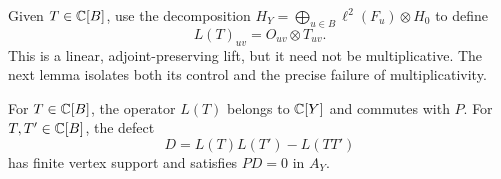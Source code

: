 Given $T\in\mathbb C[B]$, use the decomposition
$H_Y=\bigoplus_{u\in B}\ell^2(F_u)\otimes H_0$ to define
\begin{equation}\label{eq:transport-lift}
 L(T)_{uv}=O_{uv}\otimes T_{uv}.
\end{equation}
This is a linear, adjoint-preserving lift, but it need not be
multiplicative.  The next lemma isolates both its control and the precise
failure of multiplicativity.

\begin{lemma}\label{ana:transport-defect}
For $T\in\mathbb C[B]$, the operator $L(T)$ belongs to $\mathbb C[Y]$ and commutes
with $P$.  For $T,T'\in\mathbb C[B]$, the defect
\begin{equation}\label{eq:transport-defect}
 D=L(T)L(T')-L(TT')
\end{equation}
has finite vertex support and satisfies $PD=0$ in $A_Y$.
\end{lemma}

